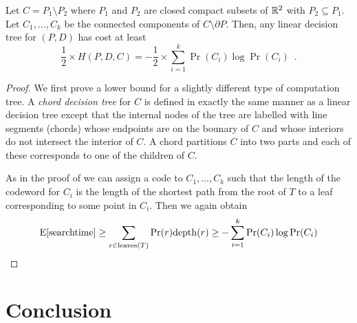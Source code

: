 \documentclass[charterfonts,lotsofwhite]{patmorin}
\begin{document}
\begin{lem}
Let $C=P_1\setminus P_2$ where $P_1$ and $P_2$ are closed compact
subsets of $\mathbb{R}^2$ with $P_2\subseteq P_1$.  Let $C_1,\ldots,C_k$ be
the connected components of $C\setminus\partial P$.  Then, any linear
decision tree for $(P,D)$ has cost at least
\[
	\frac{1}{2}\times H(P,D,C) 
		= -\frac{1}{2}\times \sum_{i=1}^k \Pr(C_i)\log \Pr(C_i)
		\enspace .
\]
\end{lem}

\begin{proof} 
We first prove a lower bound for  a slightly different type of
computation tree.  A \emph{chord decision tree} for $C$ is defined in
exactly the same manner as a linear decision tree except that the
internal nodes of the tree are labelled with line segments (chords)
whose endpoints are on the bounary of $C$ and whose interiors do not
intersect the interior of $C$.  A chord partitions $C$ into two parts
and each of these corresponds to one of the children of $C$.

As in the proof of  we can assign a code to
$C_1,\ldots,C_k$ such that the length of the codeword for $C_i$ is the
length of the shortest path from the root of $T$ to a leaf
corresponding to some point in $C_i$.  Then we again obtain
\[
  \mathrm{E}[\mathrm{search time}] 
	\ge \sum_{r\in\mathrm{leaves}(T)} \Pr(r)\mathrm{depth}(r) 
	\ge -\sum_{i=1}^k \Pr(C_i)\log\Pr(C_i)
\]

\end{proof}

\section{Conclusion}
\end{document}

